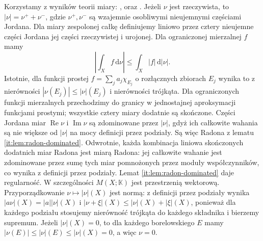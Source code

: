 \begin{uwaga}
Korzystamy z wyników teorii miary:
,
oraz .
Jeżeli $\nu$ jest rzeczywista, to
$|\nu|=\nu^++\nu^-$, gdzie $\nu^+,\nu^-$ są
wzajemnie osobliwymi nieujemnymi częściami Jordana.
Dla miary zespolonej całkę definiujemy liniowo przez
cztery nieujemne części Jordana jej części rzeczywistej
i urojonej. Dla ograniczonej mierzalnej $f$ mamy
\[
 \left|\int_X f\,\mathrm d\nu\right|
 \le\int_X |f|\,\mathrm d|\nu|.
\]
Istotnie, dla funkcji prostej $f=\sum_j a_j\chi_{E_j}$
o rozłącznych zbiorach $E_j$ wynika to z nierówności
$|\nu(E_j)|\le|\nu|(E_j)$ i nierówności trójkąta.
Dla ograniczonych funkcji mierzalnych przechodzimy do
granicy w jednostajnej aproksymacji funkcjami prostymi;
wszystkie cztery miary dodatnie są skończone.
Części Jordana miar $\operatorname{Re}\nu$ i
$\operatorname{Im}\nu$ są zdominowane przez $|\nu|$,
gdyż ich całkowite wahania są nie większe od $|\nu|$
na mocy definicji przez podziały. Są więc Radona
z lematu \ref{it:lem:radon-dominated}. Odwrotnie,
każda kombinacja liniowa skończonych dodatnich miar
Radona jest miarą Radona: jej całkowite wahanie
jest zdominowane przez sumę tych miar pomnożonych
przez moduły współczynników, co wynika z definicji
przez podziały. Lemat \ref{it:lem:radon-dominated}
daje regularność. W szczególności $M(X;\mathbb K)$
jest przestrzenią wektorową. Przyporządkowanie
$\nu\mapsto|\nu|(X)$ jest normą: z definicji przez
podziały wynika $|a\nu|(X)=|a||\nu|(X)$ i
$|\nu+\xi|(X)\le|\nu|(X)+|\xi|(X)$, ponieważ dla
każdego podziału stosujemy nierówność trójkąta
do każdego składnika i bierzemy supremum.
Jeżeli $|\nu|(X)=0$, to dla każdego borelowskiego $E$
mamy $|\nu(E)|\le|\nu|(E)\le|\nu|(X)=0$,
a więc $\nu=0$.
\end{uwaga}

